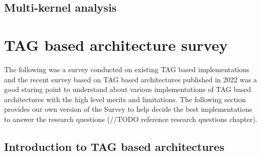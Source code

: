 









\subsection{Multi-kernel analysis}





\section[TAG based architecture survey]{TAG based architecture survey}   
The following was a survey conducted on existing TAG based implementations and the 
recent survey based on TAG based architectures \cite{acmTAGSurvey} published
in 2022 was a good staring point to understand about various implementations of TAG
based architectures with the high level merits and limitations. The following section 
provides our own version of the Survey to help decide the best implementations 
to answer the research questions (//TODO reference research questions chapter).

\subsection{Introduction to TAG based architectures}

